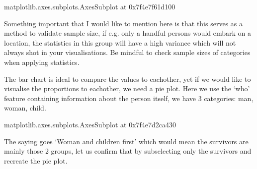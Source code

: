 \documentclass[letterpaper,10pt,english]{jupyterBook}
\begin{document}
\begin{sphinxVerbatim}[commandchars=\\\{\}]
\PYGZlt{}matplotlib.axes.\PYGZus{}subplots.AxesSubplot at 0x7f4e7f61d100\PYGZgt{}
\end{sphinxVerbatim}

\noindent{}

\sphinxAtStartPar
Something important that I would like to mention here is that this serves as a method to validate sample size, if e.g. only a handful persons would embark on a location, the statistics in this group will have a high variance which will not always shot in your visualisations.
Be mindful to check sample sizes of categories when applying statistics.

\sphinxAtStartPar
The bar chart is ideal to compare the values to eachother, yet if we would like to visualise the proportions to eachother, we need a pie plot.
Here we use the ‘who’ feature containing information about the person itself, we have 3 categories: man, woman, child.

\begin{sphinxVerbatim}[commandchars=\\\{\}]
\end{sphinxVerbatim}

\begin{sphinxVerbatim}[commandchars=\\\{\}]
\PYGZlt{}matplotlib.axes.\PYGZus{}subplots.AxesSubplot at 0x7f4e7d2ca430\PYGZgt{}
\end{sphinxVerbatim}

\noindent{}

\sphinxAtStartPar
The saying goes ‘Woman and children first’ which would mean the survivors are mainly those 2 groups, let us confirm that by subselecting only the survivors and recreate the pie plot.

\begin{sphinxVerbatim}[commandchars=\\\{\}]
\PYG{p}{[}\PYG{p}{]}
\end{sphinxVerbatim}
\end{document}
